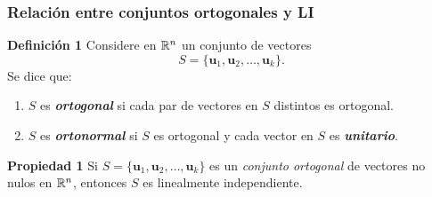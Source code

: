 \begin{frame}\frametitle{Relación entre conjuntos ortogonales y LI}

\begin{defi}{\textbf{Definición 1}}\justifying
	Considere en $\mathbb{R}^n$ un conjunto de vectores
	\[
	S = \{ \mathbf{u}_1, \mathbf{u}_2, \hdots, \mathbf{u}_k\}.
	\]
	Se dice que:
	\begin{enumerate}
		\item[\labelname{$a$}] $S$ es  \textbf{\textit{ortogonal}} si cada par de vectores en $S$ distintos es ortogonal. %
		\item[\labelname{$b$}] $S$ es \textbf{\textit{ortonormal}} si $S$ es ortogonal y cada vector en $S$ es \textbf{\textit{unitario}}.
	\end{enumerate}
	
\end{defi}	

\begin{prop}{\textbf{Propiedad 1}}
	\justifying
	Si $S = \{ \mathbf{u}_1, \mathbf{u}_2, \hdots, \mathbf{u}_k\}$ es un \textit{conjunto ortogonal} de vectores no nulos en $\mathbb{R}^n$, entonces
	$S$ es linealmente independiente.
\end{prop}	


\end{frame}


\subsection{}

